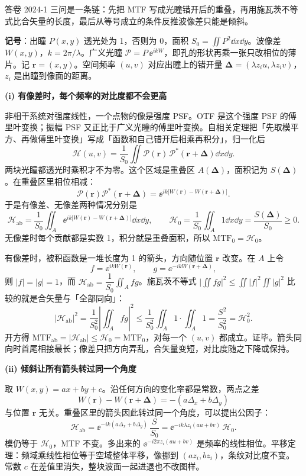 \begin{exam}{答卷 2024-1}
三问是一条链：先把 MTF 写成光瞳错开后的重叠，再用施瓦茨不等式比合矢量的长度，最后从等号成立的条件反推波像差只能是倾斜。

\textbf{记号}：出瞳 $P(x,y)$ 透光处为 1，否则为 0，面积 $S_0=\iint P^2\dd x\dd y$。波像差 $W(x,y)$，$k=2\pi/\lambda$。广义光瞳 $\mathcal P=P\,\ee^{ikW}$，即孔的形状再乘一张只改相位的薄片。记 $\bm r=(x,y)$。空间频率 $(u,v)$ 对应出瞳上的错开量 $\bm\Delta=(\lambda z_iu,\lambda z_iv)$，$z_i$ 是出瞳到像面的距离。

\textbf{(i) 有像差时，每个频率的对比度都不会更高}

非相干系统对强度线性，一个点物的像是强度 PSF。OTF 是这个强度 PSF 的傅里叶变换；振幅 PSF 又正比于广义光瞳的傅里叶变换。自相关定理把「先取模平方、再做傅里叶变换」写成「函数和自己错开后相乘再积分」，归一化后
\[
\mathcal H(u,v)=\frac{1}{S_0}\iint\mathcal P(\bm r)\,\mathcal P^*(\bm r+\bm\Delta)\dd x\dd y .
\]
两块光瞳都透光时乘积才不为零。这个区域是重叠区 $A(\bm\Delta)$，面积记为 $S(\bm\Delta)$。在重叠区里相位相减：
\[
\mathcal P(\bm r)\mathcal P^*(\bm r+\bm\Delta)=\ee^{ik\bigl[W(\bm r)-W(\bm r+\bm\Delta)\bigr]} .
\]
于是有像差、无像差两种情况分别是
\[
\mathcal H_{\text{ab}}=\frac1{S_0}\iint_{A}\ee^{ik\bigl[W(\bm r)-W(\bm r+\bm\Delta)\bigr]}\dd x\dd y,\qquad
\mathcal H_0=\frac1{S_0}\iint_A 1\dd x\dd y=\frac{S(\bm\Delta)}{S_0}\ge0 .
\]
无像差时每个贡献都是实数 1，积分就是重叠面积，所以 $\mathrm{MTF}_0=\mathcal H_0$。

有像差时，被积函数是一堆长度为 1 的箭头，方向随位置 $\bm r$ 改变。在 $A$ 上令
\[
f=\ee^{ikW(\bm r)},\qquad g=\ee^{-ikW(\bm r+\bm\Delta)},
\]
则 $|f|=|g|=1$，而 $\mathcal H_{\text{ab}}=\dfrac1{S_0}\displaystyle\iint_A fg$。施瓦茨不等式 $\bigl|\iint fg\bigr|^2\le\iint|f|^2\iint|g|^2$ 比较的就是合矢量与「全部同向」：
\[
|\mathcal H_{\text{ab}}|^2
=\frac1{S_0^2}\left|\iint_A fg\right|^2
\le\frac1{S_0^2}\iint_A 1\cdot\iint_A 1
=\frac{S^2}{S_0^2}
=\mathcal H_0^2 .
\]
开方得 $\mathrm{MTF}_{\text{ab}}=|\mathcal H_{\text{ab}}|\le\mathcal H_0=\mathrm{MTF}_0$，对每一个 $(u,v)$ 都成立。证毕。箭头同向时首尾相接最长；像差只把方向弄乱，合矢量变短，对比度随之下降或保持。

\textbf{(ii) 倾斜让所有箭头转过同一个角度}

取 $W(x,y)=ax+by+c$。沿任何方向的变化率都是常数，两点之差
\[
W(\bm r)-W(\bm r+\bm\Delta)=-(a\Delta_x+b\Delta_y)
\]
与位置 $\bm r$ 无关。重叠区里的箭头因此转过同一个角度，可以提出公因子：
\[
\mathcal H_{\text{ab}}=\ee^{-ik(a\Delta_x+b\Delta_y)}\,\frac{S}{S_0}
=\ee^{-ik\lambda z_i(au+bv)}\,\mathcal H_0 .
\]
模仍等于 $\mathcal H_0$，MTF 不变。多出来的 $\ee^{-i2\pi z_i(au+bv)}$ 是频率的线性相位。平移定理：频域乘线性相位等于空域整体平移，像挪到 $(az_i,bz_i)$，条纹对比度不变。常数 $c$ 在差值里消失，整块波面一起进退也不改图样。


\end{exam}
